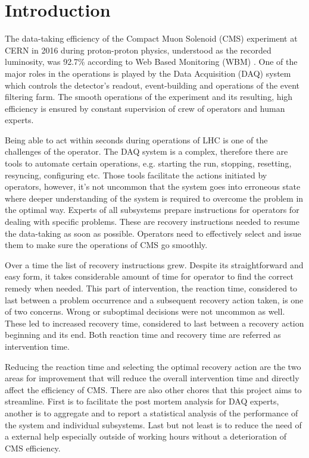 \documentclass[a4paper]{jpconf}
\begin{document}
\section{Introduction}
The data-taking efficiency of the Compact Muon Solenoid (CMS) \cite{cms} experiment at CERN in 2016 during proton-proton physics, understood as the recorded luminosity, was 92.7\% according to Web Based Monitoring (WBM) \cite{wbm}. One of the major roles in the operations is played by the Data Acquisition (DAQ) system which controls the detector's readout, event-building and operations of the event filtering farm. The smooth operations of the experiment and its resulting, high efficiency is ensured by constant supervision of crew of operators and human experts.

Being able to act within seconds during operations of LHC is one of the challenges of the operator. The DAQ system is a complex, therefore there are tools to automate certain operations, e.g. starting the run, stopping, resetting, resyncing, configuring etc. Those tools facilitate the actions initiated by operators, however, it's not uncommon that the system goes into erroneous state where deeper understanding of the system is required to overcome the problem in the optimal way. Experts of all subsystems prepare instructions for operators for dealing with specific problems. These are recovery instructions needed to resume the data-taking as soon as possible. Operators need to effectively select and issue them to make sure the operations of CMS go smoothly.

Over a time the list of recovery instructions grew. Despite its straightforward and easy form, it takes considerable amount of time for operator to find the correct remedy when needed. This part of intervention, the reaction time, considered to last between a problem occurrence and a subsequent recovery action taken, is one of two concerns. Wrong or suboptimal decisions were not uncommon as well. These led to increased recovery time, considered to last between a recovery action beginning and its end. Both reaction time and recovery time are referred as intervention time.

Reducing the reaction time and selecting the optimal recovery action are the two areas for improvement that will reduce the overall intervention time and directly affect the efficiency of CMS. There are also other chores that this project aims to streamline. First is to facilitate the post mortem analysis for DAQ experts, another is to aggregate and to report a statistical analysis of the performance of the system and individual subsystems. Last but not least is to reduce the need of a external help especially outside of working hours without a deterioration of CMS efficiency. 
\end{document}
